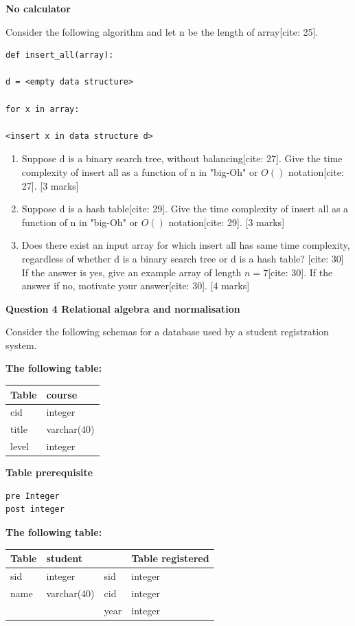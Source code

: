 \textbf{No calculator}

Consider the following algorithm and let n be the length of array[cite: 25].
\begin{verbatim}
def insert_all(array):

d = <empty data structure>

for x in array:

<insert x in data structure d>
\end{verbatim}
\begin{enumerate}
    \item[(b)] Suppose d is a binary search tree, without balancing[cite: 27]. Give the time complexity of insert all as a function of n in "big-Oh" or $O()$ notation[cite: 27]. [3 marks]
    \item[(c)] Suppose d is a hash table[cite: 29]. Give the time complexity of insert all as a function of n in "big-Oh" or $O()$ notation[cite: 29]. [3 marks]
    \item[(d)] Does there exist an input array for which insert all has same time complexity, regardless of whether d is a binary search tree or d is a hash table? [cite: 30] If the answer is yes, give an example array of length $n=7$[cite: 30]. If the answer if no, motivate your answer[cite: 30]. [4 marks]
\end{enumerate}

\textbf{Question 4 Relational algebra and normalisation}

Consider the following schemas for a database used by a student registration system.

\textbf{The following table:}
\begin{longtable}{|l|l|}
\hline
\textbf{Table} & \textbf{course} \\
\hline
cid & integer \\
\hline
title & varchar(40) \\
\hline
level & integer \\
\hline
\end{longtable}

\textbf{Table prerequisite}
\begin{verbatim}
pre Integer
post integer
\end{verbatim}

\textbf{The following table:}
\begin{longtable}{|l|l|l|l|}
\hline
\textbf{Table} & \textbf{student} & & \textbf{Table registered} \\
\hline
sid & integer & sid & integer \\
\hline
name & varchar(40) & cid & integer \\
\hline
& & year & integer \\
\hline
\end{longtable}

